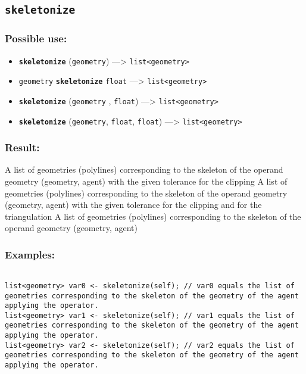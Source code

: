 \documentclass[]{book}
\providecommand{\tightlist}{%
  \setlength{\itemsep}{0pt}\setlength{\parskip}{0pt}}
\theoremstyle{definition}
\theoremstyle{definition}
\theoremstyle{definition}
\theoremstyle{remark}
\begin{document}
\subsection{\texorpdfstring{\texttt{skeletonize}}{skeletonize}}\label{skeletonize}

\subsubsection{Possible use:}\label{possible-use-479}

\begin{itemize}
\tightlist
\item
  \textbf{\texttt{skeletonize}} (\texttt{geometry}) ---\textgreater{}
  \texttt{list\textless{}geometry\textgreater{}}
\item
  \texttt{geometry} \textbf{\texttt{skeletonize}} \texttt{float}
  ---\textgreater{} \texttt{list\textless{}geometry\textgreater{}}
\item
  \textbf{\texttt{skeletonize}} (\texttt{geometry} , \texttt{float})
  ---\textgreater{} \texttt{list\textless{}geometry\textgreater{}}
\item
  \textbf{\texttt{skeletonize}} (\texttt{geometry}, \texttt{float},
  \texttt{float}) ---\textgreater{}
  \texttt{list\textless{}geometry\textgreater{}}
\end{itemize}

\subsubsection{Result:}\label{result-463}

A list of geometries (polylines) corresponding to the skeleton of the
operand geometry (geometry, agent) with the given tolerance for the
clipping A list of geometries (polylines) corresponding to the skeleton
of the operand geometry (geometry, agent) with the given tolerance for
the clipping and for the triangulation A list of geometries (polylines)
corresponding to the skeleton of the operand geometry (geometry, agent)

\subsubsection{Examples:}\label{examples-335}

\begin{verbatim}
 
list<geometry> var0 <- skeletonize(self); // var0 equals the list of geometries corresponding to the skeleton of the geometry of the agent applying the operator. 
list<geometry> var1 <- skeletonize(self); // var1 equals the list of geometries corresponding to the skeleton of the geometry of the agent applying the operator. 
list<geometry> var2 <- skeletonize(self); // var2 equals the list of geometries corresponding to the skeleton of the geometry of the agent applying the operator.
\end{verbatim}
\end{document}
